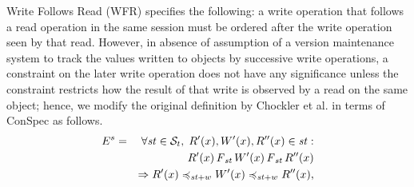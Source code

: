 \documentclass[journal,compsoc]{IEEEtran}
\begin{document}
\par Write Follows Read (WFR)  specifies the following: a write operation that follows a read operation in the same session must be ordered after the write operation seen by that read. However, in absence of assumption of a version maintenance system to track the values written to objects by successive write operations,  a constraint on the later write operation does not have any significance unless the constraint restricts how the result of that write is observed by a read on the same object; hence, we modify the original definition by Chockler et al. %
 in terms of ConSpec as follows. \\
 \begin{align}\label{eqn:WFR}
\begin{split}
E^{s} = \quad  \forall \mathit{st} \in \mathcal{S}_t, \; {R}'(x), {W}'(x), {R}''(x) \in \mathit{st} : \\
 {R}'(x) \operatorname{\it F}_\mathit{st} {W}'(x) \operatorname{\it F}_\mathit{st} {R}''(x) \\ 
 \Rightarrow {R}'(x) \preccurlyeq_{\mathit{st}+w} {W}'(x) \preccurlyeq_{\mathit{st}+w} {R}''(x), %

\end{split}
\end{align}
\end{document}
